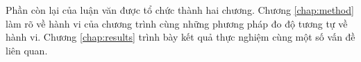 Phần còn lại của luận văn được tổ chức thành hai chương. Chương
\ref{chap:method} làm rõ về hành vi của chương trình cùng những phương
pháp đo độ tương tự về hành vi. Chương \ref{chap:results} trình bày
kết quả thực nghiệm cùng một số vấn đề liên quan.





